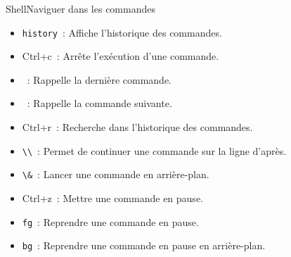 \documentclass{beamer}
\begin{document}
    \begin{frame}{Shell}{Naviguer dans les commandes}
        \begin{itemize}
            \item \lstinline{history}~: Affiche l'historique des commandes.
            \item Ctrl+c~: Arrête l'exécution d'une commande.
            \item {}~: Rappelle la dernière commande.
            \item {}~: Rappelle la commande suivante.
            \item Ctrl+r~: Recherche dans l'historique des commandes.
            \item \lstinline{\\}~: Permet de continuer une commande sur la ligne d'après.
            \item \lstinline{\&}~: Lancer une commande en arrière-plan.
            \item Ctrl+z~: Mettre une commande en pause.
            \item \lstinline{fg}~: Reprendre une commande en pause.
            \item \lstinline{bg}~: Reprendre une commande en pause en arrière-plan.
        \end{itemize}
    \end{frame}
\end{document}
